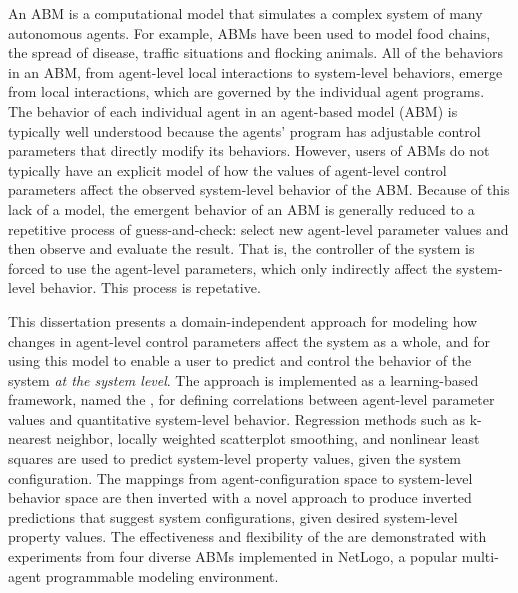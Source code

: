 \begin{singlespace}

An ABM is a computational model that simulates a complex system of many autonomous agents.
For example, ABMs have been used to model food chains, the spread of disease, traffic situations and flocking animals.
All of the behaviors in an ABM, from agent-level local interactions to system-level behaviors, emerge from local interactions, which are governed by the individual agent programs.
The behavior of each individual agent in an agent-based model (ABM) is typically well understood because the agents' program has adjustable control parameters that directly modify its behaviors.
However, users of ABMs do not typically have an explicit model of how the values of agent-level control parameters affect the observed system-level behavior of the ABM.
Because of this lack of a model, the emergent behavior of an ABM is generally reduced to a repetitive process of guess-and-check: select new agent-level parameter values and then observe and evaluate the result.
That is, the controller of the system is forced to use the agent-level parameters, which only indirectly affect the system-level behavior.
This process is repetative.

This dissertation presents a domain-independent approach for modeling how changes in agent-level control parameters affect the system as a whole, and for using this model to enable a user to predict and control the behavior of the system \textit{at the system level}.
The approach is implemented as a learning-based framework, named the \framework,  for defining correlations between agent-level parameter values and quantitative system-level behavior.
Regression methods such as k-nearest neighbor, locally weighted scatterplot smoothing, and nonlinear least squares are used to predict system-level property values, given the system configuration.
The mappings from agent-configuration space to system-level behavior space are then inverted with a novel approach to produce inverted predictions that suggest system configurations, given desired system-level property values.
The effectiveness and flexibility of the \framework are demonstrated with experiments from four diverse ABMs implemented in NetLogo, a popular multi-agent programmable modeling environment.

\end{singlespace}

\par\vfil

